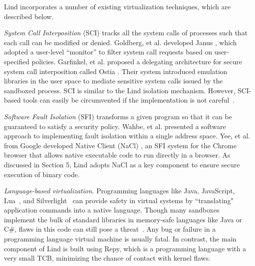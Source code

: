 
Lind incorporates a number of existing virtualization techniques, which are
described below.

\textit{System Call Interposition} (SCI) tracks all the system calls of processes such
that each call can be modified or denied.
Goldberg, et al. developed Janus \cite{Janus0:96, Janus:99},
which adopted a user-level ``monitor'' to filter system call requests based on
user-specified policies. Garfinkel, et al. proposed a delegating architecture for secure system call interposition
called Ostia \cite{SCI-04}. Their system introduced emulation libraries in the user space
to mediate sensitive system calls issued by the sandboxed process. SCI is similar to
 the Lind isolation mechanism. However, SCI-based tools can easily be circumvented
 if the implementation is not careful~\cite{Problems-SCI}.

\textit{Software Fault Isolation} (SFI) transforms a given program so that it can be guaranteed to satisfy a security policy.
Wahbe, et al. \cite{SFI:93} presented a software approach to implementing
fault isolation within a single address space.
Yee, et al. from Google developed Native Client (NaCl) \cite{NaCl-09},
an SFI system for the Chrome browser that allows native executable code to run directly in a
browser. As discussed in Section 5, Lind adopts NaCl as a key component to ensure secure execution
of binary code.

\textit{Language-based virtualization.}
Programming languages like Java, JavaScript, Lua~\cite{Lua}, and
Silverlight~\cite{Silverlight} can provide safety in virtual systems by
``translating" application commands into a native language.
%
Though many sandboxes implement the bulk of standard libraries in
memory-safe languages like Java or C\#, flaws in this code can
still pose a threat~\cite{JavaBugs, Java-Lessons}.
Any bug or failure in a programming language virtual
machine is usually fatal. In contrast, the main component of Lind
is built using Repy, which is a programming language with a very small TCB,
minimizing the chance of contact with kernel flaws.

